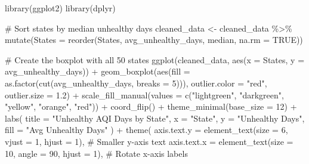\documentclass[
  12pt,
]{article}
\newenvironment{Shaded}{\begin{snugshade}}{\end{snugshade}}
\newcommand{\AttributeTok}[1]{\textcolor[rgb]{0.40,0.45,0.13}{#1}}
\newcommand{\CommentTok}[1]{\textcolor[rgb]{0.37,0.37,0.37}{#1}}
\newcommand{\ConstantTok}[1]{\textcolor[rgb]{0.56,0.35,0.01}{#1}}
\newcommand{\DecValTok}[1]{\textcolor[rgb]{0.68,0.00,0.00}{#1}}
\newcommand{\FloatTok}[1]{\textcolor[rgb]{0.68,0.00,0.00}{#1}}
\newcommand{\FunctionTok}[1]{\textcolor[rgb]{0.28,0.35,0.67}{#1}}
\newcommand{\NormalTok}[1]{\textcolor[rgb]{0.00,0.23,0.31}{#1}}
\newcommand{\OtherTok}[1]{\textcolor[rgb]{0.00,0.23,0.31}{#1}}
\newcommand{\SpecialCharTok}[1]{\textcolor[rgb]{0.37,0.37,0.37}{#1}}
\newcommand{\StringTok}[1]{\textcolor[rgb]{0.13,0.47,0.30}{#1}}
\begin{document}
\begin{Shaded}
\begin{Highlighting}[]
\FunctionTok{library}\NormalTok{(ggplot2)}
\FunctionTok{library}\NormalTok{(dplyr)}

\CommentTok{\# Sort states by median unhealthy days}
\NormalTok{cleaned\_data }\OtherTok{\textless{}{-}}\NormalTok{ cleaned\_data }\SpecialCharTok{\%\textgreater{}\%}
  \FunctionTok{mutate}\NormalTok{(}\AttributeTok{States =} \FunctionTok{reorder}\NormalTok{(States, avg\_unhealthy\_days, median, }\AttributeTok{na.rm =} \ConstantTok{TRUE}\NormalTok{))}

\CommentTok{\# Create the boxplot with all 50 states}
\FunctionTok{ggplot}\NormalTok{(cleaned\_data, }\FunctionTok{aes}\NormalTok{(}\AttributeTok{x =}\NormalTok{ States, }\AttributeTok{y =}\NormalTok{ avg\_unhealthy\_days)) }\SpecialCharTok{+}
  \FunctionTok{geom\_boxplot}\NormalTok{(}\FunctionTok{aes}\NormalTok{(}\AttributeTok{fill =} \FunctionTok{as.factor}\NormalTok{(}\FunctionTok{cut}\NormalTok{(avg\_unhealthy\_days, }\AttributeTok{breaks =} \DecValTok{5}\NormalTok{))), }
               \AttributeTok{outlier.color =} \StringTok{"red"}\NormalTok{, }\AttributeTok{outlier.size =} \FloatTok{1.2}\NormalTok{) }\SpecialCharTok{+}
  \FunctionTok{scale\_fill\_manual}\NormalTok{(}\AttributeTok{values =} \FunctionTok{c}\NormalTok{(}\StringTok{"lightgreen"}\NormalTok{, }\StringTok{"darkgreen"}\NormalTok{, }\StringTok{"yellow"}\NormalTok{, }\StringTok{"orange"}\NormalTok{, }\StringTok{"red"}\NormalTok{)) }\SpecialCharTok{+}
  \FunctionTok{coord\_flip}\NormalTok{() }\SpecialCharTok{+}
  \FunctionTok{theme\_minimal}\NormalTok{(}\AttributeTok{base\_size =} \DecValTok{12}\NormalTok{) }\SpecialCharTok{+}
  \FunctionTok{labs}\NormalTok{(}
    \AttributeTok{title =} \StringTok{"Unhealthy AQI Days by State"}\NormalTok{,}
    \AttributeTok{x =} \StringTok{"State"}\NormalTok{,}
    \AttributeTok{y =} \StringTok{"Unhealthy Days"}\NormalTok{,}
    \AttributeTok{fill =} \StringTok{"Avg Unhealthy Days"}
\NormalTok{  ) }\SpecialCharTok{+}
  \FunctionTok{theme}\NormalTok{(}
    \AttributeTok{axis.text.y =} \FunctionTok{element\_text}\NormalTok{(}\AttributeTok{size =} \DecValTok{6}\NormalTok{, }\AttributeTok{vjust =} \DecValTok{1}\NormalTok{, }\AttributeTok{hjust =} \DecValTok{1}\NormalTok{),   }\CommentTok{\# Smaller y{-}axis text}
    \AttributeTok{axis.text.x =} \FunctionTok{element\_text}\NormalTok{(}\AttributeTok{size =} \DecValTok{10}\NormalTok{, }\AttributeTok{angle =} \DecValTok{90}\NormalTok{, }\AttributeTok{hjust =} \DecValTok{1}\NormalTok{),  }\CommentTok{\# Rotate x{-}axis labels}

\end{Highlighting}
\end{Shaded}
\end{document}
